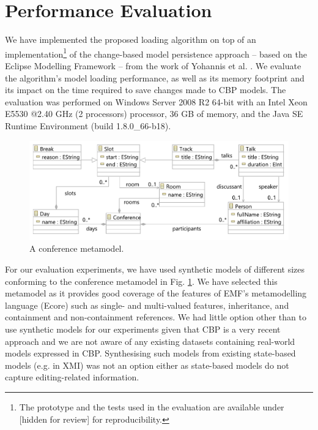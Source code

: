 \documentclass{llncs}
\begin{document}


\section{Performance Evaluation}
\label{sec:performance_evaluation}
We have implemented the proposed loading algorithm on top of an implementation\footnote{The prototype and the tests used in the evaluation are available under [hidden for review] for reproducibility. %
} of the change-based model persistence approach -- based on the Eclipse Modelling Framework -- from the work of Yohannis et al. \cite{yohannis2017turning}. We evaluate the algorithm's model loading  performance, as well as its memory footprint and its impact on the time required to save changes made to CBP models. The evaluation was performed on Windows Server 2008 R2 64-bit with an Intel Xeon E5530 @2.40 GHz (2 processors) processor, 36 GB of memory, and the Java SE Runtime Environment (build 1.8.0\_66-b18).

\begin{figure}[htbp]
    \centering
    \includegraphics[width=0.9\linewidth]{conference_metamodel}
    \caption{A conference metamodel.}   
    \label{fig:node_metamodel}
\end{figure}

For our evaluation experiments, we have used synthetic models of different sizes conforming to the conference metamodel in Fig. \ref{fig:node_metamodel}. We have selected this metamodel as it provides good coverage of the features of EMF's metamodelling language (Ecore) such as single- and multi-valued features, inheritance, and containment and non-containment references. We had little option other than to use synthetic models for our experiments given that CBP is a very recent approach and we are not aware of any existing datasets containing real-world models expressed in CBP. Synthesising such models from existing state-based models (e.g. in XMI) was not an option either as state-based models do not capture editing-related information.    
\end{document}
